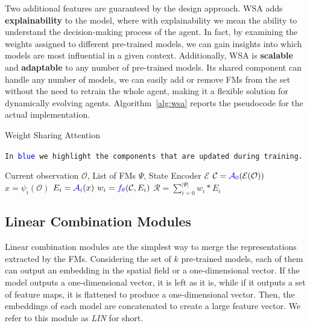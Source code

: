 Two additional features are guaranteed by the design approach.
WSA adds \textbf{explainability} to the model, where with explainability we mean the ability to understand the decision-making process of the agent.
In fact, by examining the weights assigned to different pre-trained models, we can gain insights into which models are most influential in a given context.
Additionally, WSA is \textbf{scalable} and \textbf{adaptable} to any number of pre-trained models.
Its shared component can handle any number of models, we can easily add or remove FMs from the set without the need to retrain the whole agent, making it a flexible solution for dynamically evolving agents.
Algorithm~\ref{alg:wsa} reports the pseudocode for the actual implementation.

\begin{algorithm}[ht]
    \caption{Weight Sharing Attention}\label{alg:wsa}
    \texttt{In \textcolor{blue}{blue} we highlight the components that are updated during training.}\\
    \begin{algorithmic}[1]
        \Require Current observation $\mathcal{O}$, List of FMs $\Psi$, State Encoder $\mathcal{E}$
        \State $\mathcal{C} = \textcolor{blue}{\mathcal{A}_0}(\mathcal{E}(\mathcal{O}))$ 
            \State $x = \psi_i(\mathcal{O})$ 
            \State $E_i = \textcolor{blue}{\mathcal{A}_i}(x)$ 
            \State $w_i = \textcolor{blue}{f_\theta}(\mathcal{C}, E_i)$ 
        \EndFor
        \State $\mathcal{R} = \sum_{i=0}^{|\Psi|} w_i * E_i$ 
    \end{algorithmic}
\end{algorithm}





\subsection{Linear Combination Modules}
\label{subsec:linear_combination}
Linear combination modules are the simplest way to merge the representations extracted by the FMs.
Considering the set of $k$ pre-trained models, each of them can output an embedding in the spatial field or a one-dimensional vector.
If the model outputs a one-dimensional vector, it is left as it is, while if it outputs a set of feature maps, it is flattened to produce a one-dimensional vector.
Then, the embeddings of each model are concatenated to create a large feature vector.
We refer to this module as \textit{LIN} for short.


